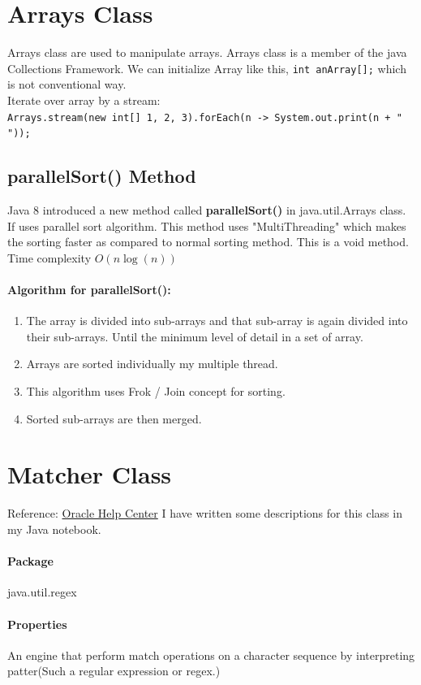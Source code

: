 \documentclass[10 pt]{book}
\begin{document}
\section{Arrays Class}
Arrays class are used to manipulate arrays. Arrays class is a member of the java Collections Framework. We can initialize Array like this, \texttt{int anArray[];} which is not conventional way.\\
Iterate over array by a stream:\\
\texttt{\footnotesize Arrays.stream(new int[] {1, 2, 3}).forEach(n -> System.out.print(n + " "));}
\subsection{parallelSort() Method}
Java 8 introduced a new method called \textbf{parallelSort()} in java.util.Arrays class. If uses parallel sort algorithm. This method uses "MultiThreading" which makes the sorting faster as compared to normal sorting method. This is a void method. Time complexity $O(n\log(n))$
\paragraph{Algorithm for parallelSort():}
	\begin{enumerate}
		\item The array is divided into sub-arrays and that sub-array is again divided into their sub-arrays. Until the minimum level of detail in a set of array.
		\item Arrays are sorted individually my multiple thread.
		\item This algorithm uses Frok / Join concept for sorting.
		\item Sorted sub-arrays are then merged.
	\end{enumerate}

\section{Matcher Class}
Reference: \href{https://docs.oracle.com/javase/7/docs/api/java/util/regex/Matcher.html}{Oracle Help Center}\linebreak
I have written some descriptions for this class in my Java notebook.

\paragraph{Package}
java.util.regex
\paragraph{Properties}
An engine that perform match operations on a character sequence by interpreting patter(Such a regular expression or regex.)
\end{document}
